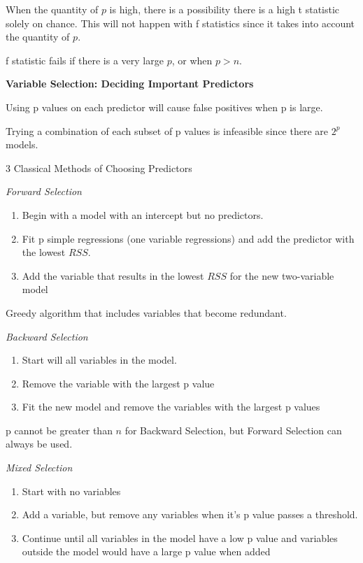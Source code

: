 \documentclass[
]{article}
\begin{document}
When the quantity of \(p\) is high, there is a possibility there is a
high t statistic solely on chance. This will not happen with f
statistics since it takes into account the quantity of \(p\).

f statistic fails if there is a very large \(p\), or when \(p > n\).

\textbf{Variable Selection: Deciding Important Predictors}

Using p values on each predictor will cause false positives when p is
large.

Trying a combination of each subset of p values is infeasible since
there are \(2^p\) models.

3 Classical Methods of Choosing Predictors

\emph{Forward Selection}

\begin{enumerate}
\def\labelenumi{\arabic{enumi}.}
\item
  Begin with a model with an intercept but no predictors.
\item
  Fit p simple regressions (one variable regressions) and add the
  predictor with the lowest \(RSS\).
\item
  Add the variable that results in the lowest \(RSS\) for the new
  two-variable model
\end{enumerate}

Greedy algorithm that includes variables that become redundant.

\emph{Backward Selection}

\begin{enumerate}
\def\labelenumi{\arabic{enumi}.}
\item
  Start will all variables in the model.
\item
  Remove the variable with the largest p value
\item
  Fit the new model and remove the variables with the largest p values
\end{enumerate}

p cannot be greater than \(n\) for Backward Selection, but Forward
Selection can always be used.

\emph{Mixed Selection}

\begin{enumerate}
\def\labelenumi{\arabic{enumi}.}
\item
  Start with no variables
\item
  Add a variable, but remove any variables when it's p value passes a
  threshold.
\item
  Continue until all variables in the model have a low p value and
  variables outside the model would have a large p value when added
\end{enumerate}
\end{document}
